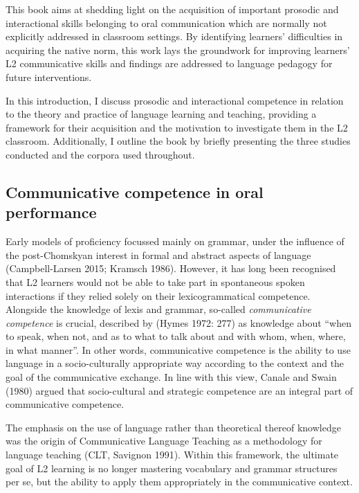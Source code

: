 \begin{styleStandard}
This book aims at shedding light on the acquisition of important prosodic and interactional skills belonging to oral communication which are normally not explicitly addressed in classroom settings. By identifying learners’ difficulties in acquiring the native norm, this work lays the groundwork for improving learners’ L2 communicative skills and findings are addressed to language pedagogy for future interventions.
\end{styleStandard}

\begin{styleStandard}
In this introduction, I discuss prosodic and interactional competence in relation to the theory and practice of language learning and teaching, providing a framework for their acquisition and the motivation to investigate them in the L2 classroom. Additionally, I outline the book by briefly presenting the three studies conducted and the corpora used throughout.
\end{styleStandard}

\subsection{Communicative competence in oral performance}
\hypertarget{Toc191305873}{}\begin{styleStandard}
Early models of proficiency focussed mainly on grammar, under the influence of the post-Chomskyan interest in formal and abstract aspects of language (Campbell-Larsen 2015; Kramsch 1986). However, it has long been recognised that L2 learners would not be able to take part in spontaneous spoken interactions if they relied solely on their lexicogrammatical competence. Alongside the knowledge of lexis and grammar, so-called \textit{communicative competence} is crucial, described by (Hymes 1972: 277) as knowledge about “when to speak, when not, and as to what to talk about and with whom, when, where, in what manner”. In other words, communicative competence is the ability to use language in a socio-culturally appropriate way according to the context and the goal of the communicative exchange. In line with this view, Canale and Swain (1980) argued that socio-cultural and strategic competence are an integral part of communicative competence.
\end{styleStandard}

\begin{styleStandard}
The emphasis on the use of language rather than theoretical thereof knowledge was the origin of Communicative Language Teaching as a methodology for language teaching (CLT, Savignon 1991). Within this framework, the ultimate goal of L2 learning is no longer mastering vocabulary and grammar structures per se, but the ability to apply them appropriately in the communicative context.
\end{styleStandard}

